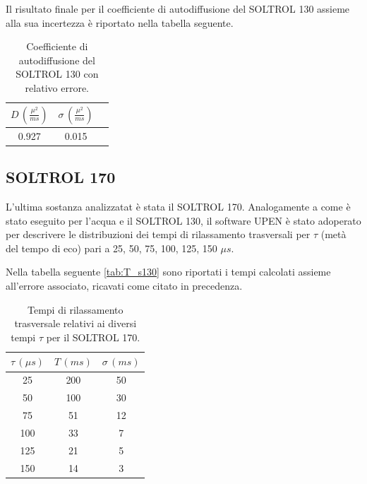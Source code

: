 Il risultato finale per il coefficiente di autodiffusione del SOLTROL 130 assieme alla sua incertezza è riportato nella tabella seguente.

\begin{table}[h!]
    \begin{center}
    \begin{tabular}{c c c}
    \toprule
    	$D\,(\frac{{\mu}^2}{ms})$ & $\sigma\,(\frac{{\mu}^2}{ms})$ \\
    \midrule
    	0.927	&	0.015	\\
    \bottomrule
    \end{tabular}
    \caption{Coefficiente di autodiffusione del SOLTROL 130 con relativo errore.}
    \label{tab:Df_s130}
    \end{center}
\end{table}


\subsection*{SOLTROL 170}

L'ultima sostanza analizzatat è stata il SOLTROL 170.
Analogamente a come è stato eseguito per l'acqua e il SOLTROL 130, il software UPEN è stato adoperato per descrivere le distribuzioni dei tempi di rilassamento trasversali per $\tau$ (metà del tempo di eco) pari a 25, 50, 75, 100, 125, 150 ${\mu}s$.

Nella tabella seguente \ref{tab:T_s130} sono riportati i tempi calcolati assieme all'errore associato, ricavati come citato in precedenza.

\begin{table}[h!]
    \begin{center}
    \begin{tabular}{c c c}
    \toprule
    	${\tau}\,({\mu}s)$ & $T\,(ms)$ & ${\sigma}\,(ms)$ \\
    \midrule
	 25 & 200 & 50 \\
	 50 & 100 & 30 \\
	 75 & 51 & 12 \\
	 100 & 33 & 7 \\
	 125 & 21 & 5 \\
	 150 & 14 & 3 \\
    \bottomrule
    \end{tabular}
    \caption{Tempi di rilassamento trasversale relativi ai diversi tempi $\tau$ per il SOLTROL 170.}
    \label{tab:T_s170}
    \end{center}
\end{table}

